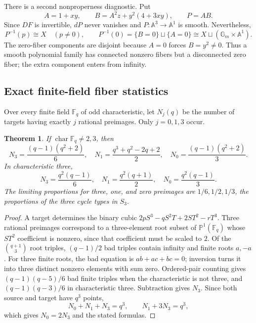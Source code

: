 \documentclass[11pt]{article}
\newtheorem{theorem}{Theorem}[section]
\theoremstyle{remark}
\newcommand{\A}{\mathbb A}
\begin{document}
There is a second nonproperness diagnostic. Put
\[
A=1+xy,\qquad B=A^2z+y^2(4+3xy),\qquad P=AB.
\]
Since $DF$ is invertible, $dP$ never vanishes and
$P:\A^3\to\A^1$ is smooth. Nevertheless,
\[
P^{-1}(p)\cong X\quad(p\neq0),\qquad
P^{-1}(0)=\{B=0\}\sqcup\{A=0\}
\cong X\sqcup(\mathbb G_m\times\A^1).
\]
The zero-fiber components are disjoint because $A=0$ forces $B=y^2\neq0$.
Thus a smooth polynomial family has connected nonzero fibers but a
disconnected zero fiber; the extra component enters from infinity.

\subsection{Exact finite-field fiber statistics}

Over every finite field $\mathbb F_q$ of odd characteristic, let $N_j(q)$ be
the number of targets having exactly $j$ rational preimages. Only
$j=0,1,3$ occur.

\begin{theorem}\label{thm:finitefields}
If $\operatorname{char}\mathbb F_q\ne2,3$, then
\[
N_3=\frac{(q-1)(q^2+2)}6,\quad
N_1=\frac{q^3+q^2-2q+2}2,\quad
N_0=\frac{(q-1)(q^2+2)}3.
\]
In characteristic three,
\[
N_3=\frac{q^2(q-1)}6,\quad
N_1=\frac{q^2(q+1)}2,\quad
N_0=\frac{q^2(q-1)}3.
\]
The limiting proportions for three, one, and zero preimages are
$1/6,1/2,1/3$, the proportions of the three cycle types in $S_3$.
\end{theorem}
\begin{proof}
A target determines the binary cubic
$2pS^3-qS^2T+2ST^2-rT^3$. Three rational preimages correspond to a
three-element root subset of $\mathbb P^1(\mathbb F_q)$ whose $ST^2$
coefficient is nonzero, since that coefficient must be scaled to $2$.
Of the $\binom{q+1}{3}$ root triples, $(q-1)/2$ bad triples contain infinity
and finite roots $a,-a$. For three finite roots, the bad equation is
$ab+ac+bc=0$; inversion turns it into three distinct nonzero elements with
sum zero. Ordered-pair counting gives $(q-1)(q-5)/6$ bad finite triples when
the characteristic is not three, and $(q-1)(q-3)/6$ in characteristic three.
Subtraction gives $N_3$. Since both source and target have $q^3$ points,
\[
N_0+N_1+N_3=q^3,\qquad N_1+3N_3=q^3,
\]
which gives $N_0=2N_3$ and the stated formulas.
\end{proof}
\end{document}
